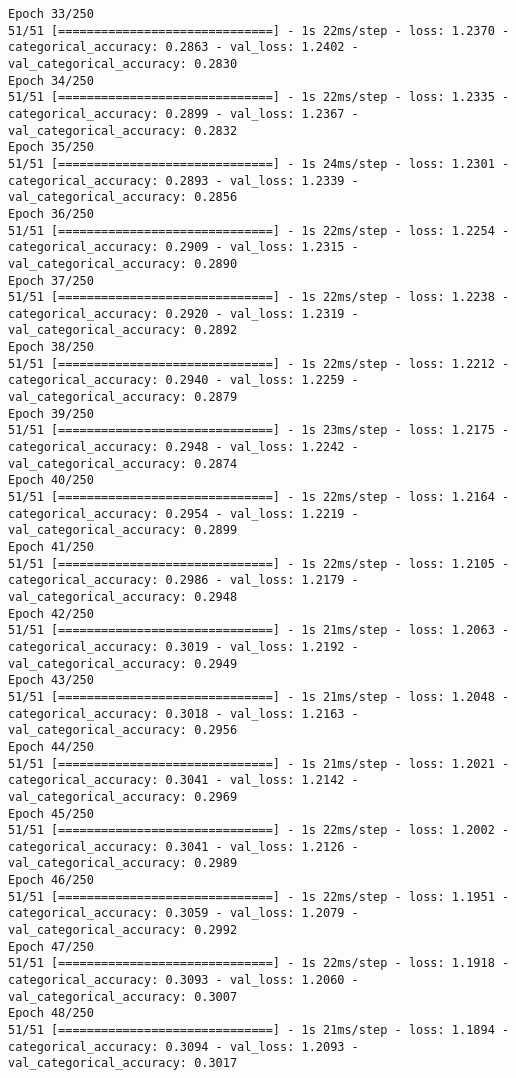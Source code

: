 \begin{lstlisting}
Epoch 33/250
51/51 [==============================] - 1s 22ms/step - loss: 1.2370 - categorical_accuracy: 0.2863 - val_loss: 1.2402 - val_categorical_accuracy: 0.2830
Epoch 34/250
51/51 [==============================] - 1s 22ms/step - loss: 1.2335 - categorical_accuracy: 0.2899 - val_loss: 1.2367 - val_categorical_accuracy: 0.2832
Epoch 35/250
51/51 [==============================] - 1s 24ms/step - loss: 1.2301 - categorical_accuracy: 0.2893 - val_loss: 1.2339 - val_categorical_accuracy: 0.2856
Epoch 36/250
51/51 [==============================] - 1s 22ms/step - loss: 1.2254 - categorical_accuracy: 0.2909 - val_loss: 1.2315 - val_categorical_accuracy: 0.2890
Epoch 37/250
51/51 [==============================] - 1s 22ms/step - loss: 1.2238 - categorical_accuracy: 0.2920 - val_loss: 1.2319 - val_categorical_accuracy: 0.2892
Epoch 38/250
51/51 [==============================] - 1s 22ms/step - loss: 1.2212 - categorical_accuracy: 0.2940 - val_loss: 1.2259 - val_categorical_accuracy: 0.2879
Epoch 39/250
51/51 [==============================] - 1s 23ms/step - loss: 1.2175 - categorical_accuracy: 0.2948 - val_loss: 1.2242 - val_categorical_accuracy: 0.2874
Epoch 40/250
51/51 [==============================] - 1s 22ms/step - loss: 1.2164 - categorical_accuracy: 0.2954 - val_loss: 1.2219 - val_categorical_accuracy: 0.2899
Epoch 41/250
51/51 [==============================] - 1s 22ms/step - loss: 1.2105 - categorical_accuracy: 0.2986 - val_loss: 1.2179 - val_categorical_accuracy: 0.2948
Epoch 42/250
51/51 [==============================] - 1s 21ms/step - loss: 1.2063 - categorical_accuracy: 0.3019 - val_loss: 1.2192 - val_categorical_accuracy: 0.2949
Epoch 43/250
51/51 [==============================] - 1s 21ms/step - loss: 1.2048 - categorical_accuracy: 0.3018 - val_loss: 1.2163 - val_categorical_accuracy: 0.2956
Epoch 44/250
51/51 [==============================] - 1s 21ms/step - loss: 1.2021 - categorical_accuracy: 0.3041 - val_loss: 1.2142 - val_categorical_accuracy: 0.2969
Epoch 45/250
51/51 [==============================] - 1s 22ms/step - loss: 1.2002 - categorical_accuracy: 0.3041 - val_loss: 1.2126 - val_categorical_accuracy: 0.2989
Epoch 46/250
51/51 [==============================] - 1s 22ms/step - loss: 1.1951 - categorical_accuracy: 0.3059 - val_loss: 1.2079 - val_categorical_accuracy: 0.2992
Epoch 47/250
51/51 [==============================] - 1s 22ms/step - loss: 1.1918 - categorical_accuracy: 0.3093 - val_loss: 1.2060 - val_categorical_accuracy: 0.3007
Epoch 48/250
51/51 [==============================] - 1s 21ms/step - loss: 1.1894 - categorical_accuracy: 0.3094 - val_loss: 1.2093 - val_categorical_accuracy: 0.3017

\end{lstlisting}
